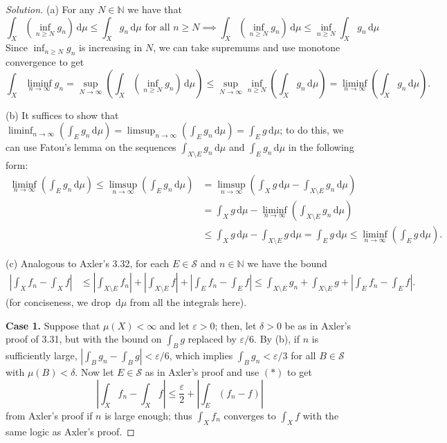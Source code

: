 \documentclass[10pt]{article}
\newcommand{\dd}{\,\mathrm{d}}
\providecommand{\eps}{\varepsilon}
\providecommand{\NN}{\mathbb N}
\newenvironment{soln}{\begin{proof}[Solution]}{\end{proof}}
\providecommand{\abs}[1]{\left|#1\right|}
\begin{document}
\begin{soln}
    (a) For any $N\in\NN$ we have that
    \begin{equation*}
	\int_X(\inf_{n\ge N}g_n)\dd\mu \le \int_X g_n\dd\mu
	\text{ for all $n\ge N$}
	\implies \int_X(\inf_{n\ge N}g_n)\dd\mu \le \inf_{n\ge N} \int_X g_n\dd\mu
    \end{equation*}
    Since $\inf_{n\ge N}g_n$ is increasing in $N$,
    we can take supremums and use monotone convergence to get
    \begin{equation*}
	\int_X \liminf_{n\to\infty} g_n
	= \sup_{N\to\infty}\left(\int_X(\inf_{n\ge N}g_n)\dd\mu\right)
	\le \sup_{N\to\infty}\inf_{n\ge N}\left(\int_Xg_n\dd\mu\right)
	= \liminf_{n\to\infty}\left(\int_Xg_n\dd\mu\right).
    \end{equation*}

    (b) It suffices to show that
    $\liminf_{n\to\infty}(\int_Eg_n\dd\mu) =
    \limsup_{n\to\infty}(\int_Eg_n\dd\mu) = \int_Eg\dd\mu$;
    to do this, we can use Fatou's lemma on the sequences
    $\int_{X\setminus E}g_n\dd\mu$ and $\int_Eg_n\dd\mu$ in the following form:
    \begin{align*}
	\liminf_{n\to\infty}\left(\int_Eg_n\dd\mu\right) \le
	\limsup_{n\to\infty}\left(\int_Eg_n\dd\mu\right)
	&= \limsup_{n\to\infty}\left(\int_Xg\dd\mu -
	\int_{X\setminus E}g_n\dd\mu\right)\\
	&= \int_Xg\dd\mu -
	\liminf_{n\to\infty}\left(\int_{X\setminus E}g_n\dd\mu\right)\\
	&\le \int_Xg\dd\mu - \int_{X\setminus E}g\dd\mu = \int_E g\dd\mu
	\le \liminf_{n\to\infty}\left(\int_Eg\dd\mu\right).
    \end{align*}

    (c) Analogous to Axler's 3.32, for each $E\in\mathcal S$ and $n\in\NN$
    we have the bound
    \begin{align*}
	\abs{\int_Xf_n - \int_Xf} &\le
	\abs{\int_{X\setminus E} f_n} + \abs{\int_{X\setminus E} f} +
	\abs{\int_E f_n - \int_E f} \le
	\int_{X\setminus E} g_n + \int_{X\setminus E}g
	+ \abs{\int_E f_n - \int_E f}.
	\tag{$\ast$}\label{eq:dct-bound}
    \end{align*}
    (for conciseness, we drop $\dd\mu$ from all the integrals here).
    \vspace{6pt}

    \textbf{Case 1.}
    Suppose that $\mu(X) < \infty$ and let $\eps>0$;
    then, let $\delta>0$ be as in Axler's proof of 3.31,
    but with the bound on $\int_Bg$ replaced by $\eps/6$.
    By (b), if $n$ is sufficiently large,
    $\abs{\int_B g_n - \int_Bg} < \eps/6$, which implies $\int_B g_n < \eps/3$
    for all $B\in\mathcal S$ with $\mu(B) < \delta$.
    Now let $E\in\mathcal S$ as in Axler's proof and use $(\ast)$ to get
    \begin{equation*}
	\tag{$\dagger$}
	\abs{\int_Xf_n - \int_Xf} \le \frac\eps2 + \abs{\int_E (f_n-f)}
    \end{equation*}
    from Axler's proof if $n$ is large enough;
    thus $\int_Xf_n$ converges to $\int_Xf$
    with the same logic as Axler's proof.
    \vspace{6pt}


\end{soln}
\end{document}
